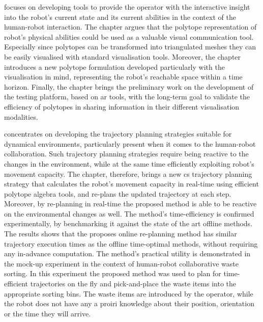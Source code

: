  focuses on developing tools to provide the operator with the interactive insight into the robot's current state and its current abilities in the context of the human-robot interaction.
The chapter argues that the polytope representation of robot's physical abilities could be used as a valuable visual communication tool. Especially since polytopes can be transformed into triangulated meshes they can be easily visualised with standard visualisation tools. Moreover, the chapter introduces a new polytope formulation developed particularly with the visualisation in mind, representing the robot's reachable space within a time horizon. Finally, the chapter brings the preliminary work on the development of the testing platform, based on \gls{ar} tools, with the long-term goal to validate the efficiency of polytopes in sharing information in their different visualisation modalities.

 concentrates on developing the trajectory planning strategies suitable for dynamical environments, particularly present when it comes to the human-robot collaboration. Such trajectory planning strategies require being reactive to the changes in the environment, while at the same time efficiently exploiting robot's movement capacity. 
The chapter, therefore, brings a new \gls{cs} trajectory planning strategy that calculates the robot's movement capacity in real-time using efficient polytope algebra tools, and re-plans the updated trajectory at each step. Moreover, by re-planning in real-time the proposed method is able to be reactive on the environmental changes as well. The method's time-efficiency is confirmed experimentally, by benchmarking it against the state of the art offline methods. The results shows that the proposes online re-planning method has similar trajectory execution times as the offline time-optimal methods, without requiring any in-advance computation. The method's practical utility is demonstrated in the mock-up experiment in the context of human-robot collaborative waste sorting. In this experiment the proposed method was used to plan for time-efficient trajectories on the fly and pick-and-place the waste items into the appropriate sorting bins. The waste items are introduced by the operator, while the robot does not have any a proiri knowledge about their position, orientation or the time they will arrive. 


